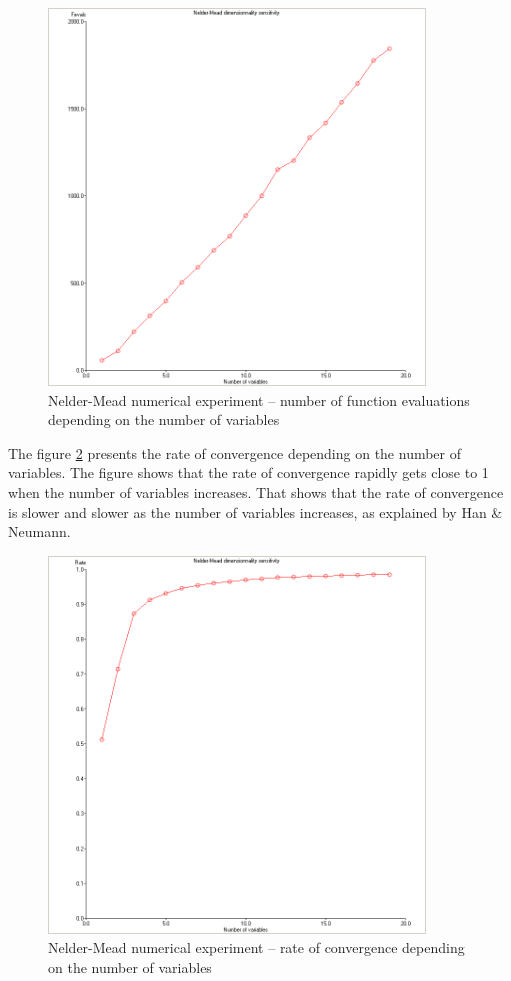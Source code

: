 \begin{figure}
\begin{center}
\includegraphics[width=10cm]{neldermead-dimension-nfevals.png}
\end{center}
\caption{Nelder-Mead numerical experiment -- number of function evaluations 
depending on the number of variables}
\label{fig-nm-numexp3-fvn}
\end{figure}

The figure \ref{fig-nm-numexp3-rho} presents the rate of convergence 
depending on the number of variables. The figure shows that 
the rate of convergence rapidly gets close to 1 when the number 
of variables increases. That shows that the rate of convergence 
is slower and slower as the number of variables increases, as 
explained by Han \& Neumann.

\begin{figure}
\begin{center}
\includegraphics[width=10cm]{neldermead-dimension-rho.png}
\end{center}
\caption{Nelder-Mead numerical experiment -- rate of convergence 
depending on the number of variables}
\label{fig-nm-numexp3-rho}
\end{figure}

